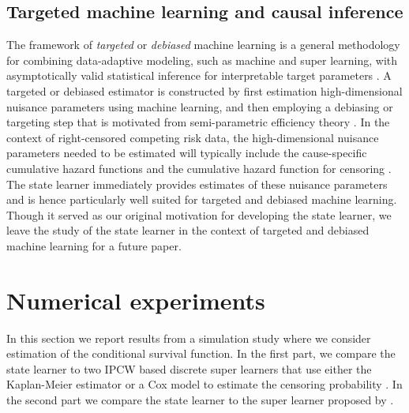 \documentclass[a4paper,danish]{article}
\theoremstyle{plain} %
\numberwithin{theorem}{section}
\theoremstyle{definition} %
\theoremstyle{remark}
\newcommand{\1}{\mathds{1}}
\begin{document}
\subsection{Targeted machine learning and causal inference}
\label{sec:targeted-learning}

The framework of \textit{targeted} or \textit{debiased}
machine learning is a general methodology for combining
data-adaptive modeling, such as machine and super learning,
with asymptotically valid statistical inference for
interpretable target parameters \citep{van2006targeted,
  chernozhukov2018double}. 
A targeted or debiased estimator is constructed by first
estimation high-dimensional nuisance parameters using machine
learning, and then employing a debiasing or targeting step
that is motivated from semi-parametric efficiency theory
\citep{pfanzagl1985contributions,bickel1993efficient,van2003unified,tsiatis2007semiparametric,kennedy2022semiparametric}.
In the context of right-censored competing risk data, the
high-dimensional nuisance parameters needed to be estimated
will typically include the cause-specific cumulative hazard
functions and the cumulative hazard function for censoring
\citep[e.g.,][]{van2003unified,rytgaard2021estimation,rytgaard2022targeted}.
The state learner immediately provides estimates of these
nuisance parameters and is hence particularly well suited for
targeted and debiased machine learning. Though it served as
our original motivation for developing the state learner, we
leave the study of the state learner in the context of
targeted and debiased machine learning for a future paper.



\section{Numerical experiments}
\label{sec:numer-exper}


In this section we report results from a simulation study where we consider
estimation of the conditional survival function. In the first part, we compare
the state learner to two IPCW based discrete super learners that use either the
Kaplan-Meier estimator or a Cox model to estimate the censoring probability
\citep{gonzalez2021stacked}. In the second part we compare the state learner to
the super learner proposed by \cite{westling2021inference}.
\end{document}
